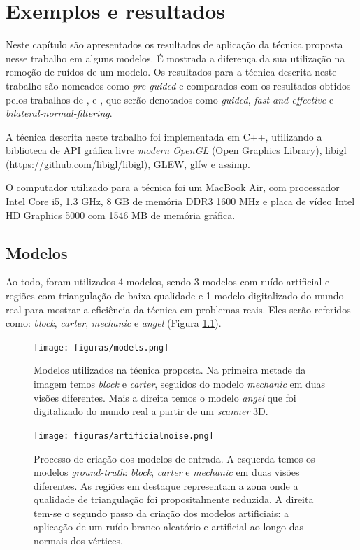 \chapter{Exemplos e resultados}
\label{chap:exemploseresultados}

Neste capítulo são apresentados os resultados de aplicação da técnica proposta nesse trabalho em alguns modelos. É mostrada a diferença da sua utilização na remoção de ruídos de um modelo. Os resultados para a técnica descrita neste trabalho são nomeados como \textit{pre-guided} e comparados com os resultados obtidos pelos trabalhos de \cite{zhang2015guided}, \cite{sun2007fast} e \cite{zheng2011bilateral}, que serão denotados como \textit{guided}, \textit{fast-and-effective} e \textit{bilateral-normal-filtering}.

A técnica descrita neste trabalho foi implementada em C++, utilizando a biblioteca de API gráfica livre \textit{modern OpenGL} (Open Graphics Library), libigl (https://github.com/libigl/libigl), GLEW, glfw e assimp.

O computador utilizado para a técnica foi um MacBook Air, com processador Intel Core i5, 1.3 GHz, 8 GB de memória DDR3 1600 MHz e placa de vídeo Intel HD Graphics 5000 com 1546 MB de memória gráfica.

\section{Modelos}

Ao todo, foram utilizados 4 modelos, sendo 3 modelos com ruído artificial e regiões com triangulação de baixa qualidade e 1 modelo digitalizado do mundo real para mostrar a eficiência da técnica em problemas reais. Eles serão referidos como: \textit{block}, \textit{carter}, \textit{mechanic} e \textit{angel} (Figura \ref{fig:models}). 

\begin{figure}[!h]
\captionsetup{width=\linewidth}
\centering
\texttt{[image: figuras/models.png]}
\caption{Modelos utilizados na técnica proposta. Na primeira metade da imagem temos \textit{block} e \textit{carter}, seguidos do modelo \textit{mechanic} em duas visões diferentes. Mais a direita temos o modelo \textit{angel} que foi digitalizado do mundo real a partir de um \textit{scanner} 3D.}
\label{fig:models}
\end{figure}

\begin{figure}[!h]
\captionsetup{width=\linewidth}
\centering 
\texttt{[image: figuras/artificialnoise.png]}
\caption{Processo de criação dos modelos de entrada. A esquerda temos os modelos \textit{ground-truth}: \textit{block}, \textit{carter} e \textit{mechanic} em duas visões diferentes. As regiões em destaque representam a zona onde a qualidade de triangulação foi propositalmente reduzida. A direita tem-se o segundo passo da criação dos modelos artificiais: a aplicação de um ruído branco aleatório e artificial ao longo das normais dos vértices.}
\label{fig:artificialnoise}
\end{figure}

